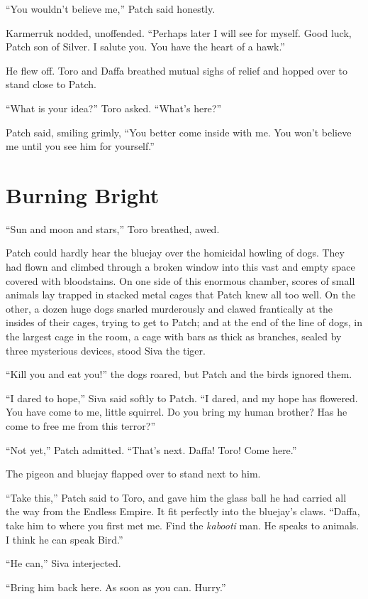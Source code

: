\documentclass[12pt]{memoir}
\begin{document}
“You wouldn’t believe me,” Patch said honestly.

Karmerruk nodded, unoffended. “Perhaps later I will see for
myself. Good luck, Patch son of Silver. I salute you. You have the
heart of a hawk.”

He flew off. Toro and Daffa breathed mutual sighs of relief and hopped
over to stand close to Patch.

“What is your idea?” Toro asked. “What’s here?”

Patch said, smiling grimly, “You better come inside with me. You won’t
believe me until you see him for yourself.”


\section{Burning Bright}

“Sun and moon and stars,” Toro breathed, awed.

Patch could hardly hear the bluejay over the homicidal howling of
dogs. They had flown and climbed through a broken window into this
vast and empty space covered with bloodstains. On one side of this
enormous chamber, scores of small animals lay trapped in stacked metal
cages that Patch knew all too well. On the other, a dozen huge dogs
snarled murderously and clawed frantically at the insides of their
cages, trying to get to Patch; and at the end of the line of dogs, in
the largest cage in the room, a cage with bars as thick as branches,
sealed by three mysterious devices, stood Siva the tiger.

“Kill you and eat you!” the dogs roared, but Patch and the birds
ignored them.

“I dared to hope,” Siva said softly to Patch. “I dared, and my hope
has flowered. You have come to me, little squirrel. Do you bring my
human brother? Has he come to free me from this terror?”

“Not yet,” Patch admitted. “That’s next. Daffa! Toro! Come here.”

The pigeon and bluejay flapped over to stand next to him.

“Take this,” Patch said to Toro, and gave him the glass ball he had
carried all the way from the Endless Empire. It fit perfectly into the
bluejay’s claws. “Daffa, take him to where you first met me. Find the
\textit{kabooti} man. He speaks to animals. I think he can speak
Bird.”

“He can,” Siva interjected.

“Bring him back here. As soon as you can. Hurry.”
\end{document}
